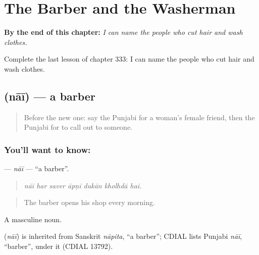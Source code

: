 
\chapter{The Barber and the Washerman}
\label{ch:pa-a2-the-barber-and-the-washerman}

\begin{chapteropening}
\textbf{By the end of this chapter:} \emph{I can name the people who cut hair and wash clothes.}

Complete the last lesson of chapter 333: I can name the people who cut hair and wash clothes.
\end{chapteropening}

\section[\texorpdfstring{\pa{ਨਾਈ} (nāī)}{ਨਾਈ (nāī)}]{ (nāī) — a barber}

\label{lesson:PA-C333-nai}



\begin{quote}
Before the new one: say the Punjabi for a woman's female friend, then the Punjabi for to call out to someone.
\end{quote}

\subsection*{You'll want to know: }
\textbf{} — \emph{nāī} — \textquotedblleft{}a barber\textquotedblright{}.

\begin{quote}
      
\end{quote}

\begin{quote}
\emph{nāī har saver āpṇī dukān kholhdā hai.}
\end{quote}

\begin{quote}
The barber opens his shop every morning.
\end{quote}

A masculine noun.

\begin{cousinweb}
\textbf{} (\emph{nāī}) is inherited from Sanskrit \emph{nāpita}, \textquotedblleft{}a barber\textquotedblright{}; CDIAL lists Punjabi \emph{nāī}, \textquotedblleft{}barber\textquotedblright{}, under it (CDIAL 13792).
\end{cousinweb}

